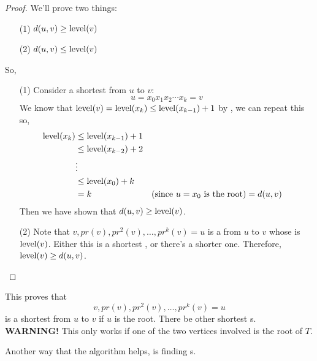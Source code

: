 \documentclass[english, 11pt]{article}
\begin{document}
\begin{proof}
  We'll prove two things:
  \begin{itemize}
    \item[(1)] $d(u,v) \geq \operatorname{level}(v)$
    \item[(2)] $d(u,v) \leq \operatorname{level}(v)$
  \end{itemize}
  So,
  \begin{itemize}
    \item[(1)] Consider a shortest  from $u$ to $v$:
    \[ u = x_0x_1x_2\cdots x_k = v\]
    We know that $\operatorname{level}(v) = \operatorname{level}(x_k) \leq \operatorname{level}(x_{k-1}) + 1$ by , we can repeat this so,
    \begin{align*}
      \operatorname{level}(x_k) & \leq \operatorname{level}(x_{k-1}) + 1 \\
                  & \leq \operatorname{level}(x_{k-2}) + 2 \\
                  & \vdots \\
                  & \leq \operatorname{level}(x_0) + k \\
                  & = k & \mbox{(since $u = x_0$ is the root)}
                  & = d(u,v)
    \end{align*}
    Then we have shown that $d(u,v) \geq \operatorname{level}(v)$.
    \item[(2)] Note that $v, pr(v), pr^2(v), \ldots, pr^k(v) = u$ is a  from $u$ to $v$ whose  is $\operatorname{level}(v)$. Either this is a shortest , or there's a shorter one. Therefore, $\operatorname{level}(v) \geq d(u,v)$.
  \end{itemize}
\end{proof}
This proves that
\[ v, pr(v), pr^2(v), \ldots, pr^k(v) = u \]
is a shortest  from $u$ to $v$ if $u$ is the root. There be other shortest s. \\
\textbf{WARNING!} This only works if one of the two vertices involved is the root of $T$.

Another way that the algorithm helps, is finding  s.
\end{document}
